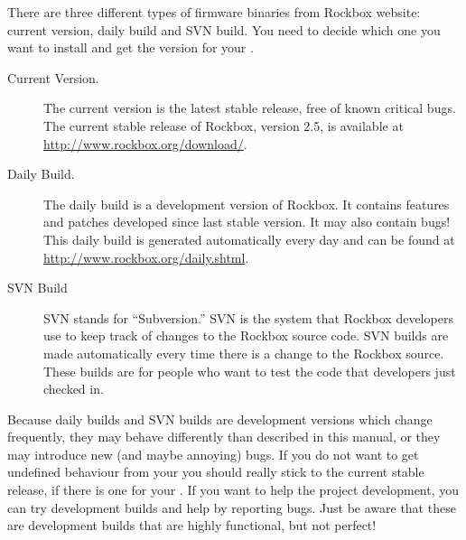 There are three different types of firmware binaries from Rockbox website:
\label{Version}
current version, daily build and SVN build. You need to decide which one
you want to install and get the version for your \dap{}.

\begin{description}

\item[Current Version.] The current version is the latest stable release, free
  of known critical bugs. The current stable release of Rockbox, version 2.5,
  is available at \url{http://www.rockbox.org/download/}.

\item[Daily Build.] The daily build is a development version of Rockbox. It
  contains features and patches developed since last stable version. It
  may also contain bugs! This daily build is generated automatically every day
  and can be found at \url{http://www.rockbox.org/daily.shtml}.

\item[SVN Build] SVN stands for
  ``Subversion.'' SVN is the system that Rockbox
  developers use to keep track of changes to the Rockbox source code. SVN
  builds are made automatically every time there is a change to the
  Rockbox source. These builds are for people who want to test the code
  that developers just checked in.

\end{description}


Because daily builds and SVN builds are development versions which change
frequently, they may behave differently than described in this manual, or
they may introduce new (and maybe annoying) bugs. If you do not want to get
undefined behaviour from your \dap{} you should really stick to the current
stable release, if there is one for your \dap{}. If you want to help the
project development, you can try development builds and help by reporting
bugs. Just be aware that these are development builds that are  highly
functional, but not perfect!

